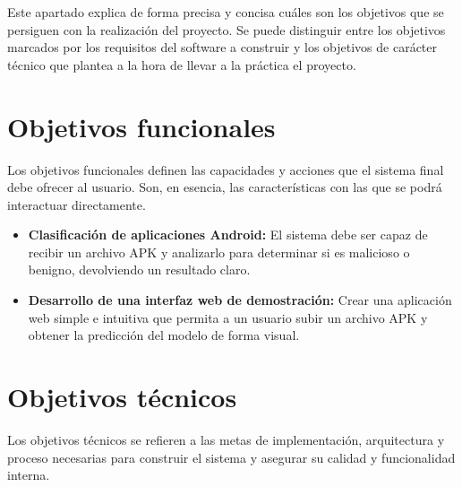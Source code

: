 
Este apartado explica de forma precisa y concisa cuáles son los objetivos que se persiguen con la realización del proyecto. Se puede distinguir entre los objetivos marcados por los requisitos del software a construir y los objetivos de carácter técnico que plantea a la hora de llevar a la práctica el proyecto.

\section{Objetivos funcionales}
Los objetivos funcionales definen las capacidades y acciones que el sistema final debe ofrecer al usuario. Son, en esencia, las características con las que se podrá interactuar directamente.

\begin{itemize}
	\item \textbf{Clasificación de aplicaciones Android:} El sistema debe ser capaz de recibir un archivo APK y analizarlo para determinar si es malicioso o benigno, devolviendo un resultado claro.
	
	\item \textbf{Desarrollo de una interfaz web de demostración:} Crear una aplicación web simple e intuitiva que permita a un usuario subir un archivo APK y obtener la predicción del modelo de forma visual.
\end{itemize}

\section{Objetivos técnicos}
Los objetivos técnicos se refieren a las metas de implementación, arquitectura y proceso necesarias para construir el sistema y asegurar su calidad y funcionalidad interna.

